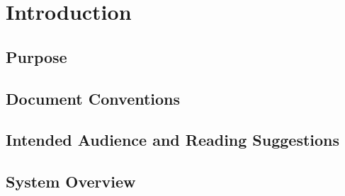 \section{Introduction}
\label{sec:introduction}

\subsection{Purpose}
\label{sec:purpose}

\subsection{Document Conventions}
\label{sec:conventions}

\subsection{Intended Audience and Reading Suggestions}
\label{sec:audience}

\subsection{System Overview}
\label{sec:overview}

